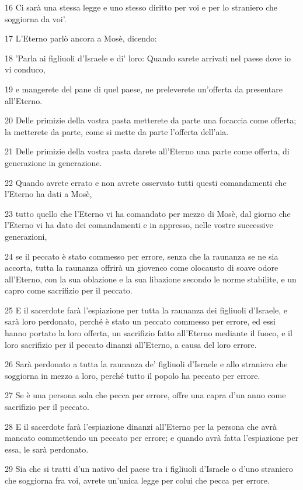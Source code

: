 \par 16 Ci sarà una stessa legge e uno stesso diritto per voi e per lo straniero che soggiorna da voi'.
\par 17 L'Eterno parlò ancora a Mosè, dicendo:
\par 18 'Parla ai figliuoli d'Israele e di' loro: Quando sarete arrivati nel paese dove io vi conduco,
\par 19 e mangerete del pane di quel paese, ne preleverete un'offerta da presentare all'Eterno.
\par 20 Delle primizie della vostra pasta metterete da parte una focaccia come offerta; la metterete da parte, come si mette da parte l'offerta dell'aia.
\par 21 Delle primizie della vostra pasta darete all'Eterno una parte come offerta, di generazione in generazione.
\par 22 Quando avrete errato e non avrete osservato tutti questi comandamenti che l'Eterno ha dati a Mosè,
\par 23 tutto quello che l'Eterno vi ha comandato per mezzo di Mosè, dal giorno che l'Eterno vi ha dato dei comandamenti e in appresso, nelle vostre successive generazioni,
\par 24 se il peccato è stato commesso per errore, senza che la raunanza se ne sia accorta, tutta la raunanza offrirà un giovenco come olocausto di soave odore all'Eterno, con la sua oblazione e la sua libazione secondo le norme stabilite, e un capro come sacrifizio per il peccato.
\par 25 E il sacerdote farà l'espiazione per tutta la raunanza dei figliuoli d'Israele, e sarà loro perdonato, perché è stato un peccato commesso per errore, ed essi hanno portato la loro offerta, un sacrifizio fatto all'Eterno mediante il fuoco, e il loro sacrifizio per il peccato dinanzi all'Eterno, a causa del loro errore.
\par 26 Sarà perdonato a tutta la raunanza de' figliuoli d'Israele e allo straniero che soggiorna in mezzo a loro, perché tutto il popolo ha peccato per errore.
\par 27 Se è una persona sola che pecca per errore, offre una capra d'un anno come sacrifizio per il peccato.
\par 28 E il sacerdote farà l'espiazione dinanzi all'Eterno per la persona che avrà mancato commettendo un peccato per errore; e quando avrà fatta l'espiazione per essa, le sarà perdonato.
\par 29 Sia che si tratti d'un nativo del paese tra i figliuoli d'Israele o d'uno straniero che soggiorna fra voi, avrete un'unica legge per colui che pecca per errore.
